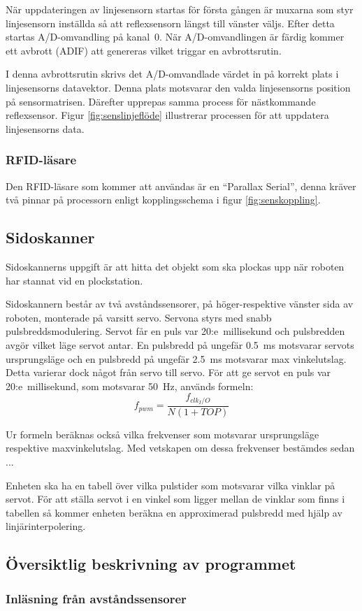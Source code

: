 När uppdateringen av linjesensorn startas för första gången är muxarna som styr linjesensorn inställda så att reflexsensorn längst till vänster väljs. Efter detta startas A/D-omvandling på kanal~0. När A/D-omvandlingen är färdig kommer ett avbrott (ADIF) att genereras vilket triggar en avbrottsrutin.

I denna avbrottsrutin skrivs det A/D-omvandlade värdet in på korrekt plats i linjesensorns datavektor. Denna plats motsvarar den valda linjesensorns position på sensormatrisen. Därefter upprepas samma process för nästkommande reflexsensor. Figur \ref{fig:senslinjeflöde} illustrerar processen för att uppdatera linjesensorns data.

\subsubsection{RFID-läsare}
Den RFID-läsare som kommer att användas är en “Parallax Serial”, denna kräver två pinnar på processorn enligt kopplingsschema i figur \ref{fig:senskoppling}.

\subsection{Sidoskanner}
Sidoskannerns uppgift är att hitta det objekt som ska plockas upp när roboten har stannat vid en plockstation.  

Sidoskannern består av två avståndssensorer, på höger-respektive vänster sida av roboten, monterade på varsitt servo. Servona styrs med snabb pulsbreddsmodulering. Servot får en puls var 20:e~millisekund och pulsbredden avgör vilket läge servot antar. En pulsbredd på ungefär 0.5~ms motsvarar servots ursprungsläge och en pulsbredd på ungefär 2.5~ms motsvarar max vinkelutslag. Detta varierar dock något från servo till servo.
För att ge servot en puls var 20:e~millisekund, som motsvarar 50~Hz, används formeln:
$$f_{pwm} = \frac{f_{clk_I/O}}{N(1 + TOP)}$$


Ur formeln beräknas också vilka frekvenser som motsvarar ursprungsläge respektive maxvinkelutslag. Med vetskapen om dessa frekvenser bestämdes sedan ...


 Enheten ska ha en tabell över vilka pulstider som motsvarar vilka vinklar på servot. För att ställa servot i en vinkel som ligger mellan de vinklar som finns i tabellen så kommer enheten beräkna en approximerad pulsbredd med hjälp av linjärinterpolering.

\subsection{Översiktlig beskrivning av programmet}

\subsubsection{Inläsning från avståndssensorer}







